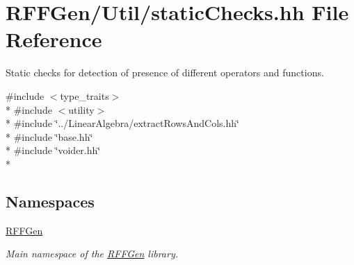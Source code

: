 \hypertarget{staticChecks_8hh}{\section{R\-F\-F\-Gen/\-Util/static\-Checks.hh File Reference}
\label{staticChecks_8hh}
}


Static checks for detection of presence of different operators and functions.  


{\ttfamily \#include $<$type\-\_\-traits$>$}\\*
{\ttfamily \#include $<$utility$>$}\\*
{\ttfamily \#include \char`\"{}../\-Linear\-Algebra/extract\-Rows\-And\-Cols.\-hh\char`\"{}}\\*
{\ttfamily \#include \char`\"{}base.\-hh\char`\"{}}\\*
{\ttfamily \#include \char`\"{}voider.\-hh\char`\"{}}\\*
\subsection*{Namespaces}
\begin{DoxyCompactItemize}
\item 
\hyperlink{namespaceRFFGen}{R\-F\-F\-Gen}
\begin{DoxyCompactList}\small\item\em Main namespace of the \hyperlink{namespaceRFFGen}{R\-F\-F\-Gen} library. \end{DoxyCompactList}\end{DoxyCompactItemize}
